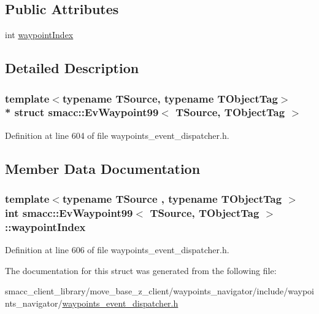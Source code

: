 \subsection*{Public Attributes}
\begin{DoxyCompactItemize}
\item 
int \hyperlink{structsmacc_1_1EvWaypoint99_a72cc67f20ffe48fc2a7b7cd4fa08a45c}{waypoint\+Index}
\end{DoxyCompactItemize}


\subsection{Detailed Description}
\subsubsection*{template$<$typename T\+Source, typename T\+Object\+Tag$>$\\*
struct smacc\+::\+Ev\+Waypoint99$<$ T\+Source, T\+Object\+Tag $>$}



Definition at line 604 of file waypoints\+\_\+event\+\_\+dispatcher.\+h.



\subsection{Member Data Documentation}
\subsubsection[{\texorpdfstring{waypoint\+Index}{waypointIndex}}]{\setlength{\rightskip}{0pt plus 5cm}template$<$typename T\+Source , typename T\+Object\+Tag $>$ int {\bf smacc\+::\+Ev\+Waypoint99}$<$ T\+Source, T\+Object\+Tag $>$\+::waypoint\+Index}\hypertarget{structsmacc_1_1EvWaypoint99_a72cc67f20ffe48fc2a7b7cd4fa08a45c}{}\label{structsmacc_1_1EvWaypoint99_a72cc67f20ffe48fc2a7b7cd4fa08a45c}


Definition at line 606 of file waypoints\+\_\+event\+\_\+dispatcher.\+h.



The documentation for this struct was generated from the following file\+:\begin{DoxyCompactItemize}
\item 
smacc\+\_\+client\+\_\+library/move\+\_\+base\+\_\+z\+\_\+client/waypoints\+\_\+navigator/include/waypoints\+\_\+navigator/\hyperlink{waypoints__event__dispatcher_8h}{waypoints\+\_\+event\+\_\+dispatcher.\+h}\end{DoxyCompactItemize}
